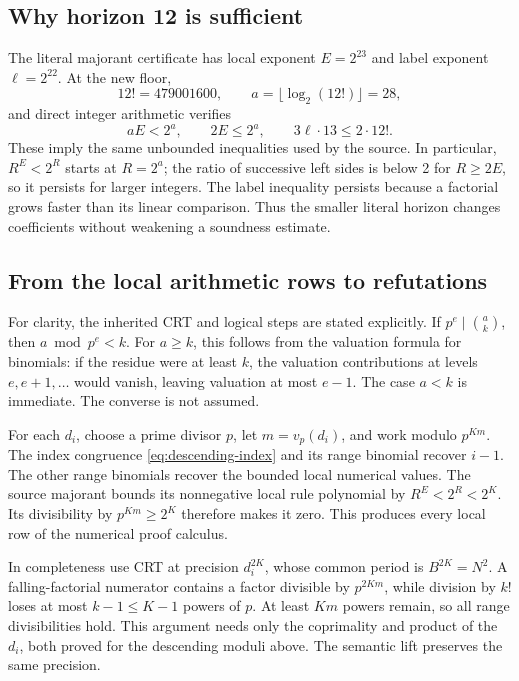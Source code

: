 \subsection{Why horizon 12 is sufficient}

The literal majorant certificate has local exponent \(E=2^{23}\)
and label exponent \(\ell=2^{22}\). At the new floor,
\[
 12!=479001600,\qquad a=\lfloor\log_2(12!)\rfloor=28,
\]
and direct integer arithmetic verifies
\[
 aE<2^a,\qquad 2E\le2^a,\qquad
 3\ell\cdot13\le2\cdot12!.
\]
These imply the same unbounded inequalities used by the source.
In particular, \(R^E<2^R\) starts at \(R=2^a\); the ratio of
successive left sides is below 2 for \(R\ge2E\), so it persists
for larger integers. The label inequality persists because a factorial
grows faster than its linear comparison. Thus the smaller literal
horizon changes coefficients without weakening a soundness estimate.

\subsection{From the local arithmetic rows to refutations}

For clarity, the inherited CRT and logical steps are stated explicitly.
If \(p^e\mid\binom ak\), then \(a\bmod p^e<k\). For
\(a\ge k\), this follows from the valuation formula for binomials:
if the residue were at least \(k\), the valuation contributions at
levels \(e,e+1,\ldots\) would vanish, leaving valuation at most
\(e-1\). The case \(a<k\) is immediate. The converse is not
assumed.

For each \(d_i\), choose a prime divisor \(p\), let
\(m=v_p(d_i)\), and work modulo \(p^{Km}\). The index congruence
\eqref{eq:descending-index} and its range binomial recover \(i-1\).
The other range binomials recover the bounded local numerical values.
The source majorant bounds its nonnegative local rule polynomial by
\(R^E<2^R<2^K\). Its divisibility by \(p^{Km}\ge2^K\)
therefore makes it zero. This produces every local row of the
numerical proof calculus.

In completeness use CRT at precision \(d_i^{2K}\), whose common
period is \(B^{2K}=N^2\). A falling-factorial numerator contains a
factor divisible by \(p^{2Km}\), while division by \(k!\) loses
at most \(k-1\le K-1\) powers of \(p\). At least \(Km\)
powers remain, so all range divisibilities hold. This argument needs
only the coprimality and product of the \(d_i\), both proved for the
descending moduli above. The semantic lift preserves the same precision.

